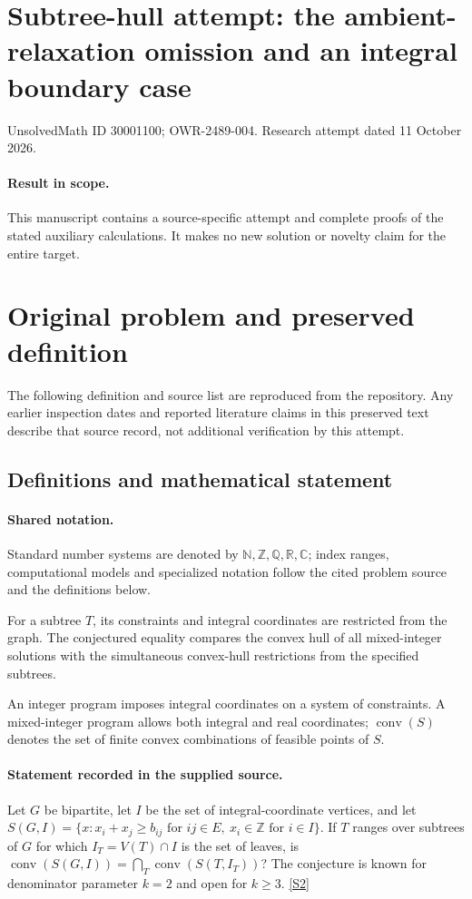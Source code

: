\documentclass[11pt]{article}
\begin{document}
\section*{Subtree-hull attempt: the ambient-relaxation omission and an integral boundary case}
\noindent UnsolvedMath ID 30001100; OWR-2489-004. Research attempt dated 11 October 2026.
\paragraph{Result in scope.}This manuscript contains a source-specific attempt and complete proofs of the stated auxiliary calculations. It makes no new solution or novelty claim for the entire target.
\section{Original problem and preserved definition}
The following definition and source list are reproduced from the repository. Any earlier inspection dates and reported literature claims in this preserved text describe that source record, not additional verification by this attempt.
\subsection{Definitions and mathematical statement}

\paragraph{Shared notation.}Standard number systems are denoted by $\mathbb N,\mathbb Z,\mathbb Q,\mathbb R,\mathbb C$; index ranges, computational models and specialized notation follow the cited problem source and the definitions below.


For a subtree $T$, its constraints and integral coordinates are restricted from the graph. The conjectured equality compares the convex hull of all mixed-integer solutions with the simultaneous convex-hull restrictions from the specified subtrees.

An integer program imposes integral coordinates on a system of constraints. A mixed-integer program allows both integral and real coordinates; $\operatorname{conv}(S)$ denotes the set of finite convex combinations of feasible points of $S$.
\paragraph{Statement recorded in the supplied source.}
Let $G$ be bipartite, let $I$ be the set of integral-coordinate vertices, and let $S(G,I)=\{x:x_i+x_j\geq b_{ij}\text{ for }ij\in E,\ x_i\in\mathbb{Z}\text{ for }i\in I\}$. If $T$ ranges over subtrees of $G$ for which $I_T=V(T)\cap I$ is the set of leaves, is $\operatorname{conv}(S(G,I))=\bigcap_T\operatorname{conv}(S(T,I_T))$? The conjecture is known for denominator parameter $k=2$ and open for $k\geq3$. \href{https://doi.org/10.4171/owr/2008/51}{[S2]}
\end{document}
